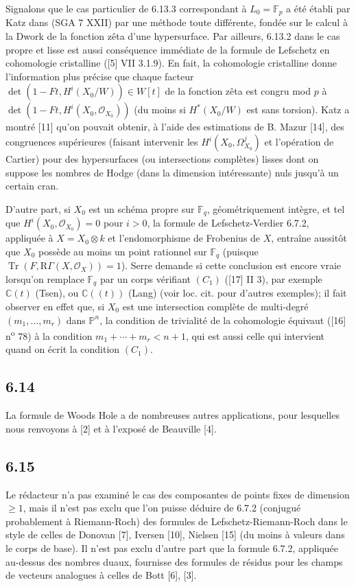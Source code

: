 \documentclass[11pt]{article}
\newcommand{\R}{\mathrm{R}}\newcommand{\RHomCore}{\mathrm{RHom}}
\providecommand{\OO}{\mathcal{O}}
\providecommand{\R}{\mathrm R}
\begin{document}
Signalons que le cas particulier de 6.13.3 correspondant à $L_0=\mathbb F_p$ a été établi par Katz dans (SGA 7 XXII) par une méthode toute différente, fondée sur le calcul à la Dwork de la fonction zêta d'une hypersurface. Par ailleurs, 6.13.2 dans le cas propre et lisse est aussi conséquence immédiate de la formule de Lefschetz en cohomologie cristalline ([5] VII 3.1.9). En fait, la cohomologie cristalline donne l'information plus précise que chaque facteur $\det(1-Ft,H^i(X_0/W))\in W[t]$ de la fonction zêta est congru mod $p$ à $\det(1-Ft,H^i(X_0,\OO_{X_0}))$ (du moins si $H^*(X_0/W)$ est sans torsion). Katz a montré [11] qu'on pouvait obtenir, à l'aide des estimations de B. Mazur [14], des congruences supérieures (faisant intervenir les $H^i(X_0,\Omega^j_{X_0})$ et l'opération de Cartier) pour des hypersurfaces (ou intersections complètes) lisses dont on suppose les nombres de Hodge (dans la dimension intéressante) nuls jusqu'à un certain cran.

D'autre part, si $X_0$ est un schéma propre sur $\mathbb F_q$, géométriquement intègre, et tel que $H^i(X_0,\OO_{X_0})=0$ pour $i>0$, la formule de Lefschetz-Verdier 6.7.2, appliquée à $X=X_0\otimes k$ et l'endomorphisme de Frobenius de $X$, entraîne aussitôt que $X_0$ possède au moins un point rationnel sur $\mathbb F_q$ (puisque $\operatorname{Tr}(F,\R\Gamma(X,\OO_X))=1$). Serre demande si cette conclusion est encore vraie lorsqu'on remplace $\mathbb F_q$ par un corps vérifiant $(C_1)$ ([17] II 3), par exemple $\mathbb C(t)$ (Tsen), ou $\mathbb C((t))$ (Lang) (voir loc. cit. pour d'autres exemples); il fait observer en effet que, si $X_0$ est une intersection complète de multi-degré $(m_1,\ldots,m_r)$ dans $\mathbb P^n$, la condition de trivialité de la cohomologie équivaut ([16] n\textsuperscript{o} 78) à la condition $m_1+\cdots+m_r<n+1$, qui est aussi celle qui intervient quand on écrit la condition $(C_1)$.

\subsection*{6.14}
La
formule de Woods Hole a de nombreuses autres applications, pour lesquelles nous renvoyons à [2] et à l'exposé de Beauville [4].


\subsection*{6.15}

Le rédacteur n'a pas examiné le cas des composantes de points fixes de dimension $\geq1$, mais il n'est pas exclu que l'on puisse déduire de 6.7.2 (conjugué probablement à Riemann-Roch) des formules de Lefschetz-Riemann-Roch dans le style de celles de Donovan [7], Iversen [10], Nielsen [15] (du moins à valeurs dans le corps de base). Il n'est pas exclu d'autre part que la formule 6.7.2, appliquée au-dessus des nombres duaux, fournisse des formules de résidus pour les champs de vecteurs analogues à celles de Bott [6], [3].
\end{document}
